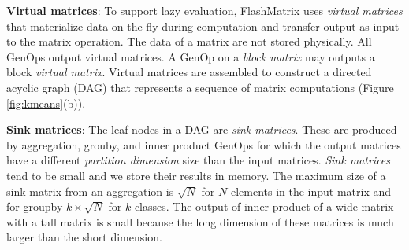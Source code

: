 \vspace{3pt}
\noindent \textbf{Virtual matrices}:
To support lazy evaluation, FlashMatrix uses \textit{virtual matrices} that
materialize data on the fly during computation and transfer output as input to
the matrix operation. The data of a matrix are not stored physically.
All GenOps output virtual matrices. A GenOp on a \textit{block matrix} may outputs
a block \textit{virtual matrix}. Virtual matrices are assembled to construct
a directed acyclic graph (DAG) that represents a sequence of matrix computations
(Figure \ref{fig:kmeans}(b)). 

\vspace{3pt}
\noindent \textbf{Sink matrices}:  The leaf nodes in a DAG are \textit{sink matrices}.
These are produced by aggregation, grouby, and inner product GenOps for which 
the output matrices have a different \textit{partition dimension} size than
the input matrices. \textit{Sink matrices} tend to be small
and we store their results in memory. 
The maximum size of a sink matrix from an aggregation
is $\sqrt{N}$ for $N$ elements in the input matrix and for
groupby $k \times \sqrt{N}$ for $k$ classes.
The output of inner product of a wide matrix with a tall matrix is small
because
the long dimension of these matrices is much larger than the short dimension.


